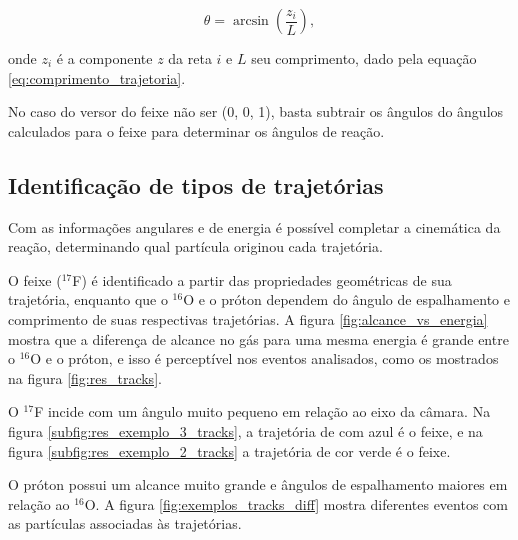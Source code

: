 \documentclass[a4paper,12pt,oneside]{book}
\begin{document}
\begin{equation}
	\theta = \arcsin \left (\frac{z_i}{L} \right),
\end{equation}

\par onde $z_i$ é a componente $z$ da reta $i$ e $L$ seu comprimento, dado pela equação \ref{eq:comprimento_trajetoria}.

\par No caso do versor do feixe não ser (0, 0, 1), basta subtrair os ângulos do ângulos calculados para o feixe para determinar os ângulos de reação.

\subsection{Identificação de tipos de trajetórias}

\par Com as informações angulares e de energia é possível completar a cinemática da reação, determinando qual partícula originou cada trajetória.

\par O feixe ($^{17}$F) é identificado a partir das propriedades geométricas de sua trajetória, enquanto que o $^{16}$O e o próton dependem do ângulo de espalhamento e comprimento de suas respectivas trajetórias. A figura \ref{fig:alcance_vs_energia} mostra que a diferença de alcance no gás para uma mesma energia é grande entre o $^{16}$O e o próton, e isso é perceptível nos eventos analisados, como os mostrados na figura \ref{fig:res_tracks}.

\par O $^{17}$F incide com um ângulo muito pequeno em relação ao eixo da câmara. Na figura \ref{subfig:res_exemplo_3_tracks}, a trajetória de com azul é o feixe, e na figura \ref{subfig:res_exemplo_2_tracks} a trajetória de cor verde é o feixe.

\par O próton possui um alcance muito grande e ângulos de espalhamento maiores em relação ao $^{16}$O. A figura \ref{fig:exemplos_tracks_diff} mostra diferentes eventos com as partículas associadas às trajetórias.
\end{document}
